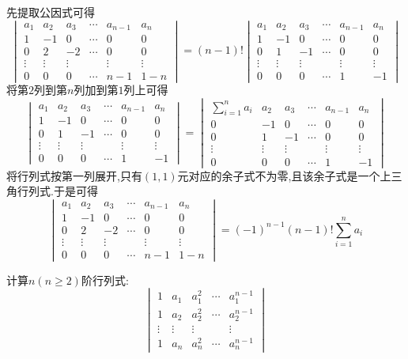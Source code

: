 \documentclass{ctexart}
\begin{document}
\begin{solution}
    先提取公因式可得
    \[\begin{vmatrix}
        a_1&a_2&a_3&\cdots&a_{n-1}&a_n\\
        1&-1&0&\cdots&0&0\\
        0&2&-2&\cdots&0&0\\
        \vdots&\vdots&\vdots& &\vdots&\vdots\\
        0&0&0&\cdots&n-1&1-n
    \end{vmatrix}=(n-1)!\begin{vmatrix}
        a_1&a_2&a_3&\cdots&a_{n-1}&a_n\\
        1&-1&0&\cdots&0&0\\
        0&1&-1&\cdots&0&0\\
        \vdots&\vdots&\vdots& &\vdots&\vdots\\
        0&0&0&\cdots&1&-1
    \end{vmatrix}\]
    将第$2$列到第$n$列加到第$1$列上可得
    \[\begin{vmatrix}
        a_1&a_2&a_3&\cdots&a_{n-1}&a_n\\
        1&-1&0&\cdots&0&0\\
        0&1&-1&\cdots&0&0\\
        \vdots&\vdots&\vdots& &\vdots&\vdots\\
        0&0&0&\cdots&1&-1
    \end{vmatrix}=\begin{vmatrix}
        \sum_{i=1}^{n}a_i&a_2&a_3&\cdots&a_{n-1}&a_n\\
        0&-1&0&\cdots&0&0\\
        0&1&-1&\cdots&0&0\\
        \vdots&\vdots&\vdots& &\vdots&\vdots\\
        0&0&0&\cdots&1&-1
    \end{vmatrix}\]
    将行列式按第一列展开,只有$(1,1)$元对应的余子式不为零,且该余子式是一个上三角行列式.于是可得
    \[\begin{vmatrix}
        a_1&a_2&a_3&\cdots&a_{n-1}&a_n\\
        1&-1&0&\cdots&0&0\\
        0&2&-2&\cdots&0&0\\
        \vdots&\vdots&\vdots& &\vdots&\vdots\\
        0&0&0&\cdots&n-1&1-n
    \end{vmatrix}=(-1)^{n-1}(n-1)!\sum_{i=1}^{n}a_i\]
\end{solution}
\begin{homework}[3]
    计算$n(n\geqslant2)$阶行列式:
    \[\begin{vmatrix}
        1&a_1&a_1^2&\cdots&a_1^{n-1}\\
        1&a_2&a_2^2&\cdots&a_2^{n-1}\\
        \vdots&\vdots&\vdots& &\vdots\\
        1&a_n&a_n^2&\cdots&a_n^{n-1}
    \end{vmatrix}\]
\end{homework}
\end{document}
